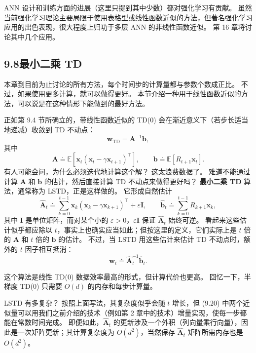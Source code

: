 \documentclass[UTF8,12pt,a4paper,fontset=fandol]{ctexart}
\begin{document}
ANN 设计和训练方面的进展（这里只提到其中少数）都对强化学习有贡献。
虽然当前强化学习理论主要局限于使用表格型或线性函数近似的方法，但著名强化学习应用的出色表现，很大程度上归功于多层 ANN 的非线性函数近似。
第 16 章将讨论其中几个应用。

\subsection*{9.8\quad 最小二乘 TD}

本章到目前为止讨论的所有方法，每个时间步的计算量都与参数个数成正比。
不过，如果使用更多计算，就可以做得更好。
本节介绍一种用于线性函数近似的方法，可以说是在这种情形下能做到的最好方法。

正如第 9.4 节所确立的，带线性函数近似的 TD(0) 会在渐近意义下（若步长适当地递减）收敛到 TD 不动点：
\[
\mathbf{w}_{\mathrm{TD}}=\mathbf{A}^{-1}\mathbf{b},
\]
其中
\[
\mathbf{A}\doteq\mathbb{E}\!\left[\mathbf{x}_t(\mathbf{x}_t-\gamma\mathbf{x}_{t+1})^\top\right],
\qquad
\mathbf{b}\doteq\mathbb{E}[R_{t+1}\mathbf{x}_t].
\]
有人可能会问，为什么必须迭代地计算这个解？
这太浪费数据了。
难道不能通过计算 $\mathbf{A}$ 和 $\mathbf{b}$ 的估计，然后直接计算 TD 不动点来做得更好吗？
\textbf{最小二乘 TD} 算法，通常称为 LSTD，正是这样做的。
它形成自然估计
\begin{equation}
\hat{\mathbf{A}}_t\doteq
\sum_{k=0}^{t-1}\mathbf{x}_k(\mathbf{x}_k-\gamma\mathbf{x}_{k+1})^\top+\varepsilon\mathbf{I},
\qquad
\hat{\mathbf{b}}_t\doteq
\sum_{k=0}^{t-1}R_{k+1}\mathbf{x}_k,
\tag{9.20}
\end{equation}
其中 $\mathbf{I}$ 是单位矩阵，而对某个小的 $\varepsilon>0$，$\varepsilon\mathbf{I}$ 保证 $\hat{\mathbf{A}}_t$ 始终可逆。
看起来这些估计似乎都应除以 $t$，事实上也确实应当如此；但按这里的定义，它们实际上是 $t$ 倍的 $\mathbf{A}$ 和 $t$ 倍的 $\mathbf{b}$ 的估计。
不过，当 LSTD 用这些估计来估计 TD 不动点时，额外的 $t$ 因子相互抵消：
\begin{equation}
\mathbf{w}_t\doteq \hat{\mathbf{A}}_t^{-1}\hat{\mathbf{b}}_t.
\tag{9.21}
\end{equation}

这个算法是线性 TD(0) 数据效率最高的形式，但计算代价也更高。
回忆一下，半梯度 TD(0) 只需要 $O(d)$ 的内存和每步计算量。

LSTD 有多复杂？
按照上面写法，其复杂度似乎会随 $t$ 增长，但 (9.20) 中两个近似量可以用我们之前介绍的技术（例如第 2 章中的技术）增量实现，使每一步都能在常数时间完成。
即便如此，$\hat{\mathbf{A}}_t$ 的更新涉及一个外积（列向量乘行向量），因此是一次矩阵更新；其计算复杂度为 $O(d^2)$，当然保存 $\hat{\mathbf{A}}_t$ 矩阵所需内存也是 $O(d^2)$。
\end{document}
